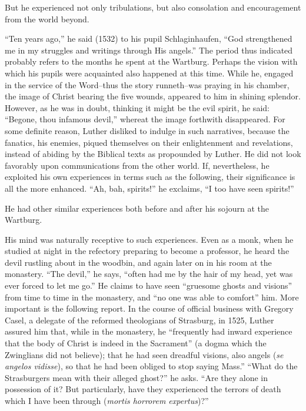But he experienced not only tribulations, but also consolation and
encouragement from the world beyond.

“Ten years ago,” he said (1532) to his pupil Schlaginhaufen, “God
strengthened me in my struggles and writings through His angels.”
The period thus indicated probably refers to the months he spent
at the Wartburg. Perhaps the vision with which his pupils were acquainted
also happened at this time. While he, engaged in the service
of the Word--thus the story runneth--was praying in his chamber,
the image of Christ bearing the five wounds, appeared to him in shining
splendor. However, as he was in doubt, thinking it might be the
evil spirit, he said: “Begone, thou infamous devil,” whereat the image
forthwith disappeared. For some definite reason, Luther disliked to
indulge in such narratives, because the fanatics, his enemies, piqued
themselves on their enlightenment and revelations, instead of abiding
by the Biblical texts as propounded by Luther. He did not look
favorably upon communications from the other world. If, nevertheless, he
exploited his own experiences in terms such as the following,
their significance is all the more enhanced. “Ah, bah, spirits!”
he exclaims, “I too have seen spirits!”

He had other similar experiences both before and after his sojourn
at the Wartburg.

His mind was naturally receptive to such experiences. Even as a
monk, when he studied at night in the refectory preparing to become
a professor, he heard the devil rustling about in the woodbin, and
again later on in his room at the monastery. “The devil,” he says,
“often had me by the hair of my head, yet was ever forced to let
me go.” He claims to have seen “gruesome ghosts and visions” from
time to time in the monastery, and ``no one was able to comfort'' him.
More important is the following report. In the course of official business
with Gregory Casel, a delegate of the reformed theologians of
Strasburg, in 1525, Luther assured him that, while in the monastery,
he “frequently had inward experience that the body of Christ is indeed
in the Sacrament” (a dogma which the Zwinglians did not believe); that
he had seen dreadful visions, also angels (\textit{se angelos vidisse}),
so that he had been obliged to stop saying Mass.” “What do
the Strasburgers mean with their alleged ghost?” he asks. “Are they
alone in possession of it? But particularly, have they experienced the
terrors of death which I have been through (\textit{mortis horrorem expertus})?”

